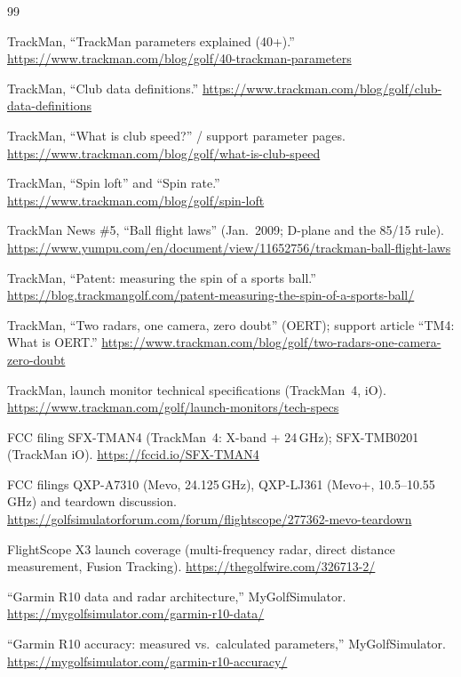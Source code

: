\begin{thebibliography}{99}

TrackMan, ``TrackMan parameters explained (40+).''
\url{https://www.trackman.com/blog/golf/40-trackman-parameters}

TrackMan, ``Club data definitions.''
\url{https://www.trackman.com/blog/golf/club-data-definitions}

TrackMan, ``What is club speed?'' / support parameter pages.
\url{https://www.trackman.com/blog/golf/what-is-club-speed}

TrackMan, ``Spin loft'' and ``Spin rate.''
\url{https://www.trackman.com/blog/golf/spin-loft}

TrackMan News \#5, ``Ball flight laws'' (Jan.\ 2009; D-plane and the
85/15 rule).
\url{https://www.yumpu.com/en/document/view/11652756/trackman-ball-flight-laws}

TrackMan, ``Patent: measuring the spin of a sports ball.''
\url{https://blog.trackmangolf.com/patent-measuring-the-spin-of-a-sports-ball/}

TrackMan, ``Two radars, one camera, zero doubt'' (OERT); support article
``TM4: What is OERT.''
\url{https://www.trackman.com/blog/golf/two-radars-one-camera-zero-doubt}

TrackMan, launch monitor technical specifications (TrackMan~4, iO).
\url{https://www.trackman.com/golf/launch-monitors/tech-specs}

FCC filing SFX-TMAN4 (TrackMan~4: X-band + 24\,GHz);
SFX-TMB0201 (TrackMan iO). \url{https://fccid.io/SFX-TMAN4}

FCC filings QXP-A7310 (Mevo, 24.125\,GHz), QXP-LJ361 (Mevo+,
10.5--10.55\,GHz) and teardown discussion.
\url{https://golfsimulatorforum.com/forum/flightscope/277362-mevo-teardown}

FlightScope X3 launch coverage (multi-frequency radar, direct distance
measurement, Fusion Tracking). \url{https://thegolfwire.com/326713-2/}

``Garmin R10 data and radar architecture,'' MyGolfSimulator.
\url{https://mygolfsimulator.com/garmin-r10-data/}

``Garmin R10 accuracy: measured vs.\ calculated parameters,''
MyGolfSimulator. \url{https://mygolfsimulator.com/garmin-r10-accuracy/}


\end{thebibliography}
